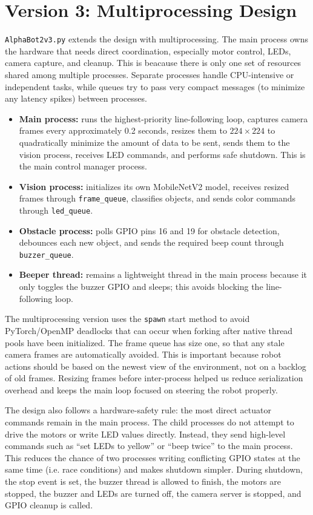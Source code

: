 \documentclass[10pt,a4paper]{article}
\begin{document}
\section{Version 3: Multiprocessing Design}
\texttt{AlphaBot2v3.py} extends the design with multiprocessing. The main process owns the hardware that needs direct coordination, especially motor control, LEDs, camera capture, and cleanup. This is beacause there is only one set of resources shared among multiple processes. Separate processes handle CPU-intensive or independent tasks, while queues try to pass very compact messages (to minimize any latency spikes) between processes.

\begin{itemize}
    \item \textbf{Main process:} runs the highest-priority line-following loop, captures camera frames every approximately 0.2 seconds, resizes them to \(224\times224\) to quadratically minimize the amount of data to be sent, sends them to the vision process, receives LED commands, and performs safe shutdown. This is the main control manager process. 
    \item \textbf{Vision process:} initializes its own MobileNetV2 model, receives resized frames through \texttt{frame\_queue}, classifies objects, and sends color commands through \texttt{led\_queue}.
    \item \textbf{Obstacle process:} polls GPIO pins 16 and 19 for obstacle detection, debounces each new object, and sends the required beep count through \texttt{buzzer\_queue}.
    \item \textbf{Beeper thread:} remains a lightweight thread in the main process because it only toggles the buzzer GPIO and sleeps; this avoids blocking the line-following loop.
\end{itemize}

The multiprocessing version uses the \texttt{spawn} start method to avoid PyTorch/OpenMP deadlocks that can occur when forking after native thread pools have been initialized. The frame queue has size one, so that any stale camera frames are automatically avoided. This is important because robot actions should be based on the newest view of the environment, not on a backlog of old frames. Resizing frames before inter-process helped us reduce serialization overhead and keeps the main loop focused on steering the robot properly.

The design also follows a hardware-safety rule: the most direct actuator commands remain in the main process. The child processes do not attempt to drive the motors or write LED values directly. Instead, they send high-level commands such as ``set LEDs to yellow'' or ``beep twice'' to the main process. This reduces the chance of two processes writing conflicting GPIO states at the same time (i.e. race conditions) and makes shutdown simpler. During shutdown, the stop event is set, the buzzer thread is allowed to finish, the motors are stopped, the buzzer and LEDs are turned off, the camera server is stopped, and GPIO cleanup is called.
\end{document}

